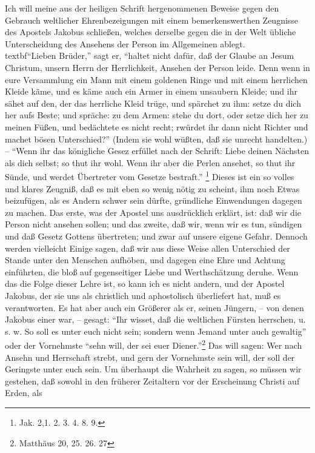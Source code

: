 Ich will meine aus der heiligen Schrift hergenommenen Beweise gegen den Gebrauch
weltlicher Ehrenbezeigungen mit einem bemerkenswerthen Zeugnisse des Apostels
Jakobus schließen, welches derselbe gegen die in der Welt übliche Unterscheidung
des Ansehens der Person im Allgemeinen ablegt.\\textbf{"`Lieben Brüder,"' sagt er,
"`haltet nicht dafür, daß der Glaube an Jesum Christum, unsern Herrn der
Herrlichkeit, Ansehen der Person leide. Denn wenn in eure Versammlung ein Mann
mit einem goldenen Ringe und mit einem herrlichen Kleide käme, und es käme auch
ein Armer in einem unsaubern Kleide; und ihr sähet auf den, der das herrliche
Kleid trüge, und spärchet zu ihm: setze du dich her aufs Beste; und spräche: zu
dem Armen: stehe du dort, oder setze dich her zu meinen Füßen, und bedächtete es
nicht recht; rwürdet ihr dann nicht Richter und machet bösen Unterschied?"'
(Indem sie wohl wüßten, daß sie unrecht handelten.) -- "`Wenn ihr das königliche
Gesez erfüllet nach der Schrift: Liebe deinen Nächsten als dich selbst; so thut
ihr wohl. Wenn ihr aber die Perlen ansehet, so thut ihr Sünde, und werdet
Übertreter vom Gesetze bestraft."'}
\footnote{Jak. 2,1. 2. 3. 4. 8. 9.} Dieses ist
ein so volles und klares Zeugniß, daß es mit eben so wenig nötig zu scheint, ihm
noch Etwas beizufügen, als es Andern schwer sein dürfte, gründliche Einwendungen
dagegen zu machen. Das erste, was der Apostel uns ausdrücklich erklärt, ist: daß
wir die Person nicht ansehen sollen; und das zweite, daß wir, wenn wir es tun,
sündigen und daß Gesetz Gottens übertreten; und zwar auf unsere eigene Gefahr.
Dennoch werden vielleicht Einige sagen, daß wir aus diese Weise allen
Unterschied der Stande unter den Menschen aufhöben, und dagegen eine Ehre und
Achtung einführten, die bloß auf gegenseitiger Liebe und Werthschätzung deruhe.
Wenn das die Folge dieser Lehre ist, so kann ich es nicht andern, und der
Apostel Jakobus, der sie uns als christlich und aphostolisch überliefert hat,
muß es verantworten. Es hat aber auch ein Größerer als er, seinen Jüngern, --
von denen Jakobus einer war, -- gesagt: "`Ihr wisset, daß die weltlichen Fürsten
herrschen, u. s. w. So soll es unter euch nicht sein; sondern wenn Jemand unter
auch gewaltig"' oder der Vornehmste "`sehn will, der sei euer
Diener."'\footnote{Matthäus 20, 25. 26. 27} Das will sagen: Wer nach Ansehn und
Herrschaft strebt, und gern der Vornehmste sein will, der soll der Geringste
unter euch sein. Um überhaupt die Wahrheit zu sagen, so müssen wir gestehen, daß
sowohl in den früherer Zeitaltern vor der Erscheinung Christi auf Erden, als
